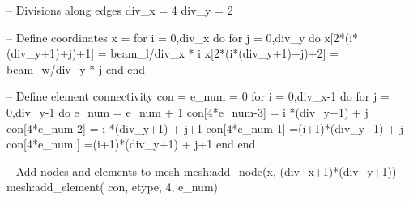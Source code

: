 -- Divisions along edges
div_x  =  4
div_y  =  2

-- Define coordinates
x   = {}
for i = 0,div_x do
    for j = 0,div_y do
        x[2*(i*(div_y+1)+j)+1] = beam_l/div_x * i
        x[2*(i*(div_y+1)+j)+2] = beam_w/div_y * j
    end
end

-- Define element connectivity
con = {}
e_num = 0
for i = 0,div_x-1 do
    for j = 0,div_y-1 do
      e_num = e_num + 1
      con[4*e_num-3] = i   *(div_y+1) + j
      con[4*e_num-2] = i   *(div_y+1) + j+1
      con[4*e_num-1] =(i+1)*(div_y+1) + j
      con[4*e_num  ] =(i+1)*(div_y+1) + j+1
    end
end

-- Add nodes and elements to mesh
mesh:add_node(x, (div_x+1)*(div_y+1))
mesh:add_element( con, etype, 4, e_num)
